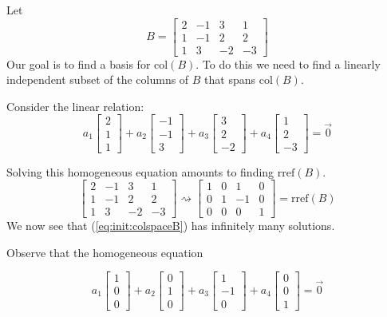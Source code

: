 \documentclass{ximera}
\begin{document}
\begin{exploration}\label{init:colspace}
Let
$$B=\begin{bmatrix}2&-1&3&1\\1&-1&2&2\\1&3&-2&-3\end{bmatrix}$$
Our goal is to find a basis for $\mbox{col}(B)$.  To do this we need to find a linearly independent subset of the columns of $B$ that spans $\mbox{col}(B)$.

Consider the linear relation:
\begin{equation}\label{eq:init:colspaceB} a_1\begin{bmatrix}2\\1\\1\end{bmatrix}+a_2\begin{bmatrix}-1\\-1\\3\end{bmatrix}+a_3\begin{bmatrix}3\\2\\-2\end{bmatrix}+a_4\begin{bmatrix}1\\2\\-3\end{bmatrix}=\vec{0}\end{equation}

Solving this homogeneous equation amounts to finding $\mbox{rref}(B)$.
$$\begin{bmatrix}2&-1&3&1\\1&-1&2&2\\1&3&-2&-3\end{bmatrix}\rightsquigarrow\begin{bmatrix}1&0&1&0\\0&1&-1&0\\0&0&0&1\end{bmatrix}=\mbox{rref}(B)$$
We now see that (\ref{eq:init:colspaceB}) has infinitely many solutions.  

Observe that the homogeneous equation

\begin{equation}\label{eq:init:colspaceR} a_1\begin{bmatrix}1\\0\\0\end{bmatrix}+a_2\begin{bmatrix}0\\1\\0\end{bmatrix}+a_3\begin{bmatrix}1\\-1\\0\end{bmatrix}+a_4\begin{bmatrix}0\\0\\1\end{bmatrix}=\vec{0}\end{equation}


\end{exploration}
\end{document}
